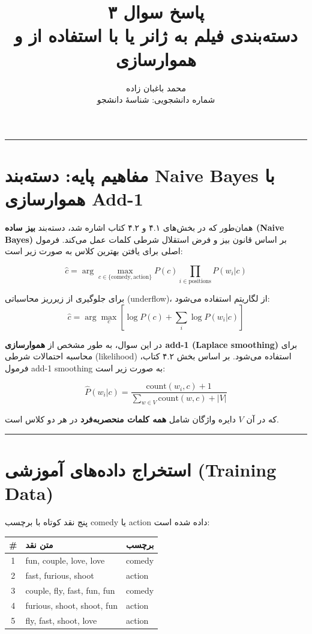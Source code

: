 \documentclass[11pt,a4paper]{article}
\title{\textbf{پاسخ سوال ۳} \\[0.4cm] \footnotesize دسته‌بندی فیلم به ژانر \en{Comedy} یا \en{Action} با استفاده از \en{Naive Bayes} و هموارسازی \en{Add-1}}
\author{محمد باغبان زاده \\ شماره دانشجویی: شناسهٔ دانشجو}
\date{}
\newcommand{\en}[1]{\textenglish{#1}}
\newcommand{\separator}{\vspace{1em}\noindent\rule{\linewidth}{0.4pt}\vspace{1em}}
\newcommand{\thickseparator}{\vspace{1em}\noindent\rule{\linewidth}{1pt}\vspace{1em}}
\begin{document}
\maketitle
\thickseparator

\section{مفاهیم پایه: دسته‌بند \en{Naive Bayes} با هموارسازی \en{Add-1}}
همان‌طور که در بخش‌های ۴.۱ و ۴.۲ کتاب اشاره شد، دسته‌بند \textbf{بیز ساده (\en{Naive Bayes})} بر اساس قانون بیز و فرض استقلال شرطی کلمات عمل می‌کند. فرمول اصلی برای یافتن بهترین کلاس به صورت زیر است:

\[
\hat{c} = \arg\max_{c \in \{\text{comedy},\text{action}\}} P(c) \prod_{i \in \text{positions}} P(w_i | c)
\]

برای جلوگیری از زیرریز محاسباتی (\en{underflow})، از لگاریتم استفاده می‌شود:
\[
\hat{c} = \arg\max_{c} \left[ \log P(c) + \sum_{i} \log P(w_i | c) \right]
\]

در این سوال، به طور مشخص از \textbf{هموارسازی \en{add-1} (\en{Laplace smoothing})} برای محاسبه احتمالات شرطی (\en{likelihood}) استفاده می‌شود. بر اساس بخش ۴.۲ کتاب، فرمول \en{add-1 smoothing} به صورت زیر است:

\[
\hat{P}(w_i|c) = \frac{\text{count}(w_i,c) + 1}{\sum_{w \in V} \text{count}(w,c) + |V|}
\]

که در آن $V$ دایره واژگان شامل \textbf{همه کلمات منحصربه‌فرد} در هر دو کلاس است.

\separator
\section{استخراج داده‌های آموزشی (\en{Training Data})}
پنج نقد کوتاه با برچسب \en{comedy} یا \en{action} داده شده است:

\begin{center}
\begin{tabular}{|c|l|l|}
\hline
\textbf{\#} & \textbf{متن نقد} & \textbf{برچسب} \\
\hline
1 & \en{fun, couple, love, love} & \en{comedy} \\
\hline
2 & \en{fast, furious, shoot} & \en{action} \\
\hline
3 & \en{couple, fly, fast, fun, fun} & \en{comedy} \\
\hline
4 & \en{furious, shoot, shoot, fun} & \en{action} \\
\hline
5 & \en{fly, fast, shoot, love} & \en{action} \\
\hline
\end{tabular}
\end{center}
\end{document}

